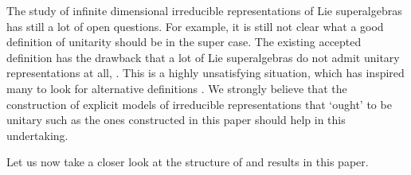 \documentclass{amsart}
\numberwithin{theorem}{section}
\theoremstyle{definition}
\theoremstyle{remark}
\begin{document}
The study of infinite dimensional irreducible representations of Lie superalgebras has still a lot of open questions. For example, it is still not clear what a good definition of unitarity should be in the super case. The existing accepted definition \cite[Definition 2 ]{CCTV} has the drawback that a lot of Lie superalgebras do not admit unitary representations at all, \cite[Theorem 6.2.1]{NeebSalmasian}. This is a highly unsatisfying situation, which has inspired many to look for alternative definitions \cite{dGM, Tuynman}. We strongly believe that the construction of explicit models of irreducible representations that `ought' to be unitary such as the ones constructed in this paper should help in this undertaking.

 Let us now take a closer look at the structure of and results in this paper.
\end{document}
